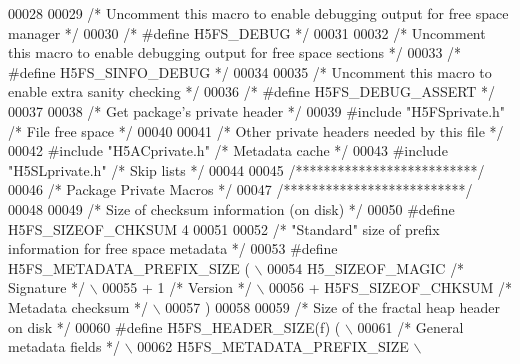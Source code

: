 \begin{DoxyCode}
00028 
00029 \textcolor{comment}{/* Uncomment this macro to enable debugging output for free space manager */}
00030 \textcolor{comment}{/* #define H5FS\_DEBUG */}
00031 
00032 \textcolor{comment}{/* Uncomment this macro to enable debugging output for free space sections */}
00033 \textcolor{comment}{/* #define H5FS\_SINFO\_DEBUG */}
00034 
00035 \textcolor{comment}{/* Uncomment this macro to enable extra sanity checking */}
00036 \textcolor{comment}{/* #define H5FS\_DEBUG\_ASSERT */}
00037 
00038 \textcolor{comment}{/* Get package's private header */}
00039 \textcolor{preprocessor}{#include "H5FSprivate.h"}    \textcolor{comment}{/* File free space                      */}
00040 
00041 \textcolor{comment}{/* Other private headers needed by this file */}
00042 \textcolor{preprocessor}{#include "H5ACprivate.h"}    \textcolor{comment}{/* Metadata cache                       */}
00043 \textcolor{preprocessor}{#include "H5SLprivate.h"}    \textcolor{comment}{/* Skip lists                           */}
00044 
00045 \textcolor{comment}{/**************************/}
00046 \textcolor{comment}{/* Package Private Macros */}
00047 \textcolor{comment}{/**************************/}
00048 
00049 \textcolor{comment}{/* Size of checksum information (on disk) */}
00050 \textcolor{preprocessor}{#define H5FS\_SIZEOF\_CHKSUM      4}
00051 
00052 \textcolor{comment}{/* "Standard" size of prefix information for free space metadata */}
00053 \textcolor{preprocessor}{#define H5FS\_METADATA\_PREFIX\_SIZE (                                           \(\backslash\)}
00054 \textcolor{preprocessor}{    H5\_SIZEOF\_MAGIC   }\textcolor{comment}{/* Signature */}\textcolor{preprocessor}{                                         \(\backslash\)}
00055 \textcolor{preprocessor}{    + 1 }\textcolor{comment}{/* Version */}\textcolor{preprocessor}{                                                         \(\backslash\)}
00056 \textcolor{preprocessor}{    + H5FS\_SIZEOF\_CHKSUM }\textcolor{comment}{/* Metadata checksum */}\textcolor{preprocessor}{                              \(\backslash\)}
00057 \textcolor{preprocessor}{    )}
00058 
00059 \textcolor{comment}{/* Size of the fractal heap header on disk */}
00060 \textcolor{preprocessor}{#define H5FS\_HEADER\_SIZE(f) (                                                 \(\backslash\)}
00061 \textcolor{preprocessor}{    }\textcolor{comment}{/* General metadata fields */}\textcolor{preprocessor}{                                             \(\backslash\)}
00062 \textcolor{preprocessor}{    H5FS\_METADATA\_PREFIX\_SIZE                                                 \(\backslash\)}

\end{DoxyCode}
